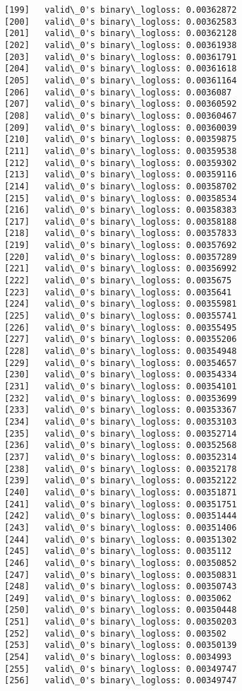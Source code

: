 \documentclass[11pt]{article}
\begin{document}
\begin{Verbatim}[commandchars=\\\{\}]
[199]	valid\_0's binary\_logloss: 0.00362872
[200]	valid\_0's binary\_logloss: 0.00362583
[201]	valid\_0's binary\_logloss: 0.00362128
[202]	valid\_0's binary\_logloss: 0.00361938
[203]	valid\_0's binary\_logloss: 0.00361791
[204]	valid\_0's binary\_logloss: 0.00361618
[205]	valid\_0's binary\_logloss: 0.00361164
[206]	valid\_0's binary\_logloss: 0.0036087
[207]	valid\_0's binary\_logloss: 0.00360592
[208]	valid\_0's binary\_logloss: 0.00360467
[209]	valid\_0's binary\_logloss: 0.00360039
[210]	valid\_0's binary\_logloss: 0.00359875
[211]	valid\_0's binary\_logloss: 0.00359538
[212]	valid\_0's binary\_logloss: 0.00359302
[213]	valid\_0's binary\_logloss: 0.00359116
[214]	valid\_0's binary\_logloss: 0.00358702
[215]	valid\_0's binary\_logloss: 0.00358534
[216]	valid\_0's binary\_logloss: 0.00358383
[217]	valid\_0's binary\_logloss: 0.00358188
[218]	valid\_0's binary\_logloss: 0.00357833
[219]	valid\_0's binary\_logloss: 0.00357692
[220]	valid\_0's binary\_logloss: 0.00357289
[221]	valid\_0's binary\_logloss: 0.00356992
[222]	valid\_0's binary\_logloss: 0.0035675
[223]	valid\_0's binary\_logloss: 0.0035641
[224]	valid\_0's binary\_logloss: 0.00355981
[225]	valid\_0's binary\_logloss: 0.00355741
[226]	valid\_0's binary\_logloss: 0.00355495
[227]	valid\_0's binary\_logloss: 0.00355206
[228]	valid\_0's binary\_logloss: 0.00354948
[229]	valid\_0's binary\_logloss: 0.00354657
[230]	valid\_0's binary\_logloss: 0.00354334
[231]	valid\_0's binary\_logloss: 0.00354101
[232]	valid\_0's binary\_logloss: 0.00353699
[233]	valid\_0's binary\_logloss: 0.00353367
[234]	valid\_0's binary\_logloss: 0.00353103
[235]	valid\_0's binary\_logloss: 0.00352714
[236]	valid\_0's binary\_logloss: 0.00352568
[237]	valid\_0's binary\_logloss: 0.00352314
[238]	valid\_0's binary\_logloss: 0.00352178
[239]	valid\_0's binary\_logloss: 0.00352122
[240]	valid\_0's binary\_logloss: 0.00351871
[241]	valid\_0's binary\_logloss: 0.00351751
[242]	valid\_0's binary\_logloss: 0.00351444
[243]	valid\_0's binary\_logloss: 0.00351406
[244]	valid\_0's binary\_logloss: 0.00351302
[245]	valid\_0's binary\_logloss: 0.0035112
[246]	valid\_0's binary\_logloss: 0.00350852
[247]	valid\_0's binary\_logloss: 0.00350831
[248]	valid\_0's binary\_logloss: 0.00350743
[249]	valid\_0's binary\_logloss: 0.0035062
[250]	valid\_0's binary\_logloss: 0.00350448
[251]	valid\_0's binary\_logloss: 0.00350203
[252]	valid\_0's binary\_logloss: 0.003502
[253]	valid\_0's binary\_logloss: 0.00350139
[254]	valid\_0's binary\_logloss: 0.0034993
[255]	valid\_0's binary\_logloss: 0.00349747
[256]	valid\_0's binary\_logloss: 0.00349747

\end{Verbatim}
\end{document}
